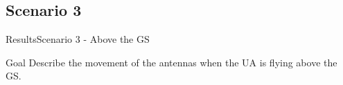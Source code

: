 \subsection{Scenario 3}

\begin{frame}{Results}{Scenario 3 - Above the GS}

  \begin{block}{Goal}
	Describe the movement of the antennas when the UA is flying above the GS.
  \end{block}

  \begin{figure}[H]
    \centerline{
    \hfill
    }
  \end{figure}

\end{frame}



